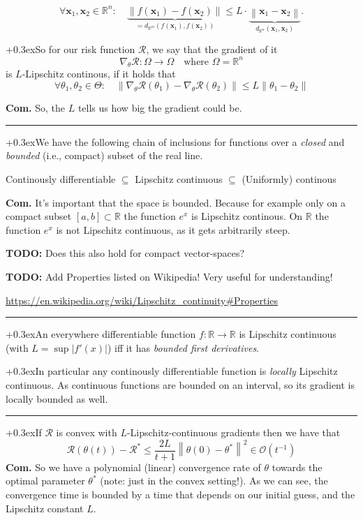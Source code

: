 \documentclass[a2paper,8pt]{extarticle}
\newcommand{\BigO}{\mathcal{O}}
\newcommand{\R}{\mathbb{R}}
\newcommand{\cR}{\mathcal{R}}
\newcommand{\abs}[1]{\left\lvert #1 \right\rvert}
\newcommand{\norm}[1]{\left\lVert #1 \right\rVert}
\renewcommand{\vec}[1]{\mathbf{#1}}
\newcommand{\vx}{\vec{x}}
\newcommand{\todo}[1]{\textbf{TODO:} #1}
\newcommand{\todo}[1]{%
}
\newcommand{\customboxpaddingsize}{0pt}
\newcommand{\emptyarg}[1][]{\ifthenelse{\isempty{#1}}{}{\ (#1)}}
\newcommand{\Thm}[1][]{{\setlength\fboxsep{\customboxpaddingsize}
\colorbox{thmcolor}{%
\color{custtitlecolor}{\textbf{T.\emptyarg[#1]}}}\kern+0.3ex}}
\newcommand{\Ex}[1][]{{\setlength\fboxsep{\customboxpaddingsize}
\colorbox{excolor}{%
\color{custtitlecolor}{\textbf{Ex.\emptyarg[#1]}}}\kern+0.3ex}}
\newcommand{\Com}{\textbf{Com.} }
\newcommand{\sep}{\vspace{0pt}\noindent\hrule\vspace{0pt}}
\newcommand{\ssep}{\hdashrule[1.1ex]{\linewidth}{0.1pt}{0.3mm}\vspace{-6pt}}
\newcommand{\sep}{\vspace{5pt}\noindent\hrule\vspace{5pt}}
\newcommand{\ssep}{\hdashrule[1.1ex]{\linewidth}{0.1pt}{0.3mm}\vspace{-3pt}}
\begin{document}
\begin{landscape}
\begin{multicols*}{7}
\[
\forall\vx_1,\vx_2\in\R^n
\colon\quad
\underbrace{\norm{f(\vx_1) - f(\vx_2)}}_{=d_{\R^m}(f(\vx_1),f(\vx_2))}
\leq
L\cdot
\underbrace{\norm{\vx_1-\vx_2}}_{d_{\R^n}(\vx_1,\vx_2)}.
\]

\ssep

\Ex So for our risk function $\cR$, we say that the gradient of it
\[
\nabla_\theta\cR\colon\Omega\to\Omega
\quad
\text{where }\Omega=\R^n
\]
is $L$-Lipschitz continous, if it holds that
\[
\forall\theta_1,\theta_2\in\Theta
\colon\quad
\norm{\nabla_\theta\cR(\theta_1)-\nabla_\theta\cR(\theta_2)}
\leq
L\norm{\theta_1-\theta_2}
\]

\Com So, the $L$ tells us how big the gradient could be.

\sep

\Thm We have the following chain of inclusions for functions over a
\emph{closed} and \emph{bounded} (i.e., compact) subset of the real line.

Continously differentiable $\subseteq$ Lipschitz continuous $\subseteq$
(Uniformly) continous

\Com It's important that the space is bounded. Because for example only on a
compact subset $[a,b]\subset\R$ the function $e^x$ is Lipschitz continous. On
$\R$ the function $e^x$ is not Lipschitz continuous, as it gets arbitrarily
steep.

\todo{Does this also hold for compact vector-spaces?}

\todo{Add Properties listed on Wikipedia! Very useful for understanding!}

\url{https://en.wikipedia.org/wiki/Lipschitz_continuity#Properties}

\sep

\Thm An everywhere differentiable function $f\colon\R\to\R$ is Lipschitz
continuous (with $L=\sup\abs{f'(x)}$) iff it has \emph{bounded first
derivatives}.

\ssep

\Thm In particular any continously differentiable function is \emph{locally}
Lipschitz continuous. As continuous functions are bounded on an interval, so its
gradient is locally bounded as well.

\sep

\Thm If $\cR$ is convex with $L$-Lipschitz-continuous gradients then
we have that 
\[ 
\cR(\theta(t))-\cR^* \leq
\frac{2L}{t+1}
\norm{\theta(0)-\theta^*}^2 \in\BigO(t^{-1}) 
\] 
\Com So we have a polynomial (linear) convergence rate of $\theta$ towards the
optimal parameter $\theta^*$ (note: just in the convex setting!). As we can see,
the convergence time is bounded by a time that depends on our initial guess, and
the Lipschitz constant $L$.


\end{multicols*}
\end{landscape}
\end{document}
